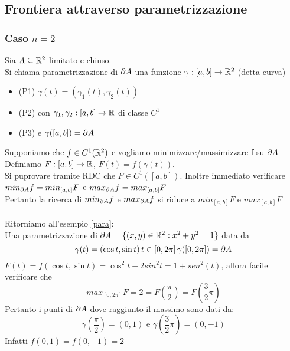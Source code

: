 \subsection{Frontiera attraverso parametrizzazione}
\subsubsection{Caso $n=2$}
  Sia $A \subseteq \mathbb{R}^2$ limitato e chiuso.\\ Si chiama \underline{parametrizzazione} di $\partial A$ una funzione
  $\gamma : [a,b]\to \mathbb{R}^2$ (detta \underline{curva})
  \begin{itemize}
    \item (P1)  $\gamma(t) = \left(\gamma_1(t), \gamma_2(t)\right)$ 
    \item (P2) con $\gamma_1, \gamma_2 : [a,b]\to \mathbb{R}$ di classe $C^1$ 
    \item (P3) e $\gamma([a,b]) = \partial A$ 
  \end{itemize}
  Supponiamo che $f \in C^1(\mathbb{R}^2)$ e vogliamo minimizzare/massimizzare f su $\partial A$\\
  Definiamo $F:[a,b]\to \mathbb{R}$, $F(t) = f(\gamma (t))$. \\
  Si pu\aco provare tramite RDC che $F\in C^1([a,b])$. Inoltre \ace immediato verificare 
  $min_{\partial A}f = min_{[a,b]}F$ e $max_{\partial A}f = max_{[a,b]}F$ \\
  Pertanto la ricerca di $min_{\partial A} f$ e $max_{\partial A} f$ si riduce a $min_{[a,b]}F$ e $max_{[a,b]}F$\\\\
  Ritorniamo all'esempio \ref{para}:\\
  Una parametrizzazione di $\partial A = \{(x,y)\in \mathbb{R}^2 : x^2+y^2=1\}$ \ace data da 
  $$\gamma(t) = (\cos t, \sin t)\, t \in [0,2\pi] \, \gamma([0,2\pi]) = \partial A$$
  $F(t) = f(\cos{t}, \sin{t}) = \cos^2 t + 2sin^2 t = 1 +sen^2 (t)$, allora \ace facile verificare che
  $$max_{[0,2\pi]}F = 2 = F\left(\frac{\pi}{2}\right) = F\left(\frac{3}{2}\pi\right)$$
  Pertanto i punti di $\partial A$ dove \ace raggiunto il massimo sono dati da:
  $$\gamma\left(\frac{\pi}{2}\right) = (0,1) \text{ e } \gamma\left(\frac{3}{2}\pi\right) = (0,-1)$$
  Infatti $f(0,1) = f(0,-1) = 2$
